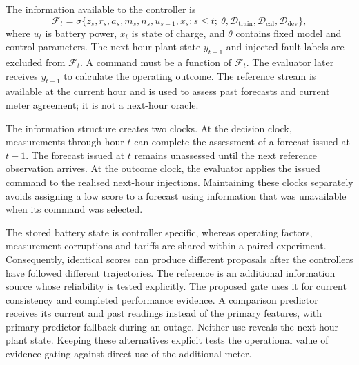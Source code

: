 \documentclass[preprint,12pt]{elsarticle}
\begin{document}
The information available to the controller is
\begin{equation}
\mathcal F_t=\sigma\{z_s,r_s,a_s,m_s,n_s,u_{s-1},x_s:s\leq t;\ \theta,\mathcal D_{\mathrm{train}},\mathcal D_{\mathrm{cal}},\mathcal D_{\mathrm{dev}}\},
\label{eq:information}
\end{equation}
where $u_t$ is battery power, $x_t$ is state of charge, and $\theta$ contains fixed model and control parameters. The next-hour plant state $y_{t+1}$ and injected-fault labels are excluded from $\mathcal F_t$. A command must be a function of $\mathcal F_t$. The evaluator later receives $y_{t+1}$ to calculate the operating outcome. The reference stream is available at the current hour and is used to assess past forecasts and current meter agreement; it is not a next-hour oracle.

The information structure creates two clocks. At the decision clock, measurements through hour $t$ can complete the assessment of a forecast issued at $t-1$. The forecast issued at $t$ remains unassessed until the next reference observation arrives. At the outcome clock, the evaluator applies the issued command to the realised next-hour injections. Maintaining these clocks separately avoids assigning a low score to a forecast using information that was unavailable when its command was selected.

The stored battery state is controller specific, whereas operating factors, measurement corruptions and tariffs are shared within a paired experiment. Consequently, identical scores can produce different proposals after the controllers have followed different trajectories. The reference is an additional information source whose reliability is tested explicitly. The proposed gate uses it for current consistency and completed performance evidence. A comparison predictor receives its current and past readings instead of the primary features, with primary-predictor fallback during an outage. Neither use reveals the next-hour plant state. Keeping these alternatives explicit tests the operational value of evidence gating against direct use of the additional meter.
\end{document}
